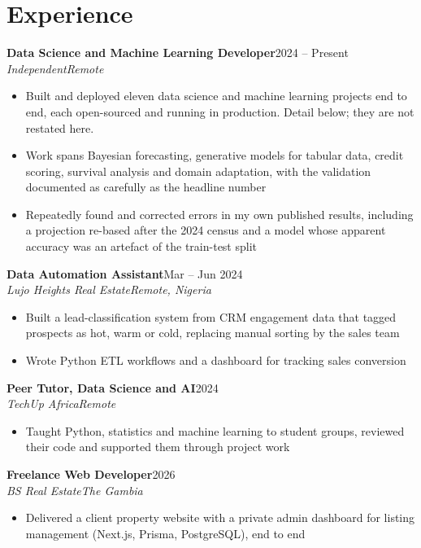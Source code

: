 \documentclass[a4paper,10pt]{article}
\newcommand{\entry}[4]{%
  \noindent\textbf{#1}\hfill{#2}\\[0.1em]
  \textit{#3}\hfill\textit{#4}\\[0.12em]
}
\begin{document}
\section{Experience}

\entry{Data Science and Machine Learning Developer}{2024 -- Present}{Independent}{Remote}
\begin{itemize}
  \item Built and deployed eleven data science and machine learning projects
    end to end, each open-sourced and running in production. Detail below;
    they are not restated here.
  \item Work spans Bayesian forecasting, generative models for tabular data,
    credit scoring, survival analysis and domain adaptation, with the
    validation documented as carefully as the headline number
  \item Repeatedly found and corrected errors in my own published results,
    including a projection re-based after the 2024 census and a model whose
    apparent accuracy was an artefact of the train-test split
\end{itemize}

\vspace{0.3em}
\entry{Data Automation Assistant}{Mar -- Jun 2024}{Lujo Heights Real Estate}{Remote, Nigeria}
\begin{itemize}
  \item Built a lead-classification system from CRM engagement data that tagged
    prospects as hot, warm or cold, replacing manual sorting by the sales team
  \item Wrote Python ETL workflows and a dashboard for tracking sales conversion
\end{itemize}

\vspace{0.3em}
\entry{Peer Tutor, Data Science and AI}{2024}{TechUp Africa}{Remote}
\begin{itemize}
  \item Taught Python, statistics and machine learning to student groups,
    reviewed their code and supported them through project work
\end{itemize}

\vspace{0.3em}
\entry{Freelance Web Developer}{2026}{BS Real Estate}{The Gambia}
\begin{itemize}
  \item Delivered a client property website with a private admin dashboard for
    listing management (Next.js, Prisma, PostgreSQL), end to end
\end{itemize}
\end{document}
